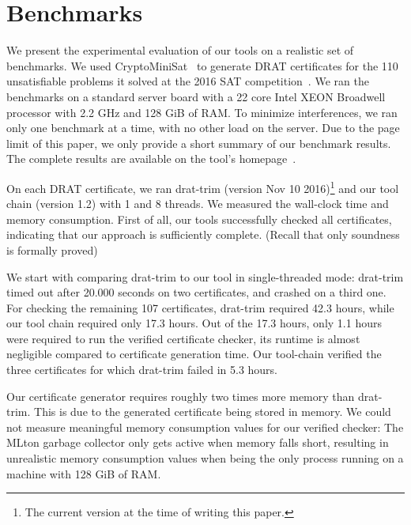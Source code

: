 \documentclass{llncs}
\begin{document}
\section{Benchmarks}\label{sec:benchmarks}
We present the experimental evaluation of our tools on a realistic set of benchmarks.
We used CryptoMiniSat~\cite{SNC09,SATCOMP16} to generate DRAT certificates for the 110 unsatisfiable problems it solved at the 2016 SAT competition~\cite{satcomp-2016}.
We ran the benchmarks on a standard server board with a 22 core Intel XEON Broadwell processor with 2.2 GHz and 128 GiB of RAM.
To minimize interferences, we ran only one benchmark at a time, with no other load on the server. 
Due to the page limit of this paper, we only provide a short summary of our benchmark results. The complete results are available on the tool's homepage~\cite{GRAT-homepage}.

On each DRAT certificate, we ran drat-trim (version Nov 10 2016)\footnote{The current version at the time of writing this paper.}
and our tool chain (version 1.2) with 1 and 8 threads.
We measured the wall-clock time and memory consumption. First of all, our tools successfully checked all certificates, 
indicating that our approach is sufficiently complete. (Recall that only soundness is formally proved)

We start with comparing drat-trim to our tool in single-threaded mode: drat-trim timed out after 20.000 seconds on two certificates, and crashed on a third one.
For checking the remaining 107 certificates, drat-trim required 42.3 hours, while our tool chain required only 17.3 hours.
Out of the 17.3 hours, only 1.1 hours were required to run the verified certificate checker, \ie its runtime is almost negligible compared to certificate generation time.
Our tool-chain verified the three certificates for which drat-trim failed in 5.3 hours.

Our certificate generator requires roughly two times more memory than drat-trim. This is due to the generated certificate being stored 
in memory. We could not measure meaningful memory consumption values for our verified checker: The MLton garbage collector only gets active when memory falls short, 
resulting in unrealistic memory consumption values when being the only process running on a machine with 128 GiB of RAM.
\end{document}

